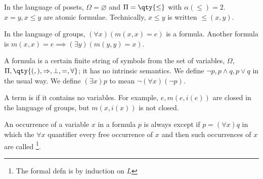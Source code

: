 \begin{example}
    In the language of posets, $\Omega = \varnothing$ and $\Pi = \qty{\leq}$ with $\alpha(\leq) = 2$.
    $x = y, x \leq y$ are atomic formulae.
    Technically, $x \leq y$ is written $\leq(x, y)$.
\end{example}

\begin{example}
    In the language of groups, $(\forall x) (m(x,x) = e)$ is a formula.
    Another formula is $m(x,x) = e \implies (\exists y) (m(y,y) = x)$.
\end{example}

\begin{remark}
    A formula is a certain finite string of symbols from the set of variables, $\Omega$, $\Pi, \qty{(, ), \implies, \bot, =, \forall}$; it has no intrinsic semantics.
    We define $\neg p, p \wedge q, p \vee q$ in the usual way.
    We define $(\exists x) p$ to mean $\neg(\forall x) (\neg p)$.
\end{remark}

A term is  if it contains no variables.
For example, $e, m(e,i(e))$ are closed in the language of groups, but $m(x,i(x))$ is not closed.

\begin{definition}
    An occurrence of a variable $x$ in a formula $p$ is always  except if $p = (\forall x) q$ in which the $\forall x$ quantifier  every free occurrence of $x$ and then such occurrences of $x$ are called \footnote{The formal defn is by induction on $L$}.
\end{definition}

